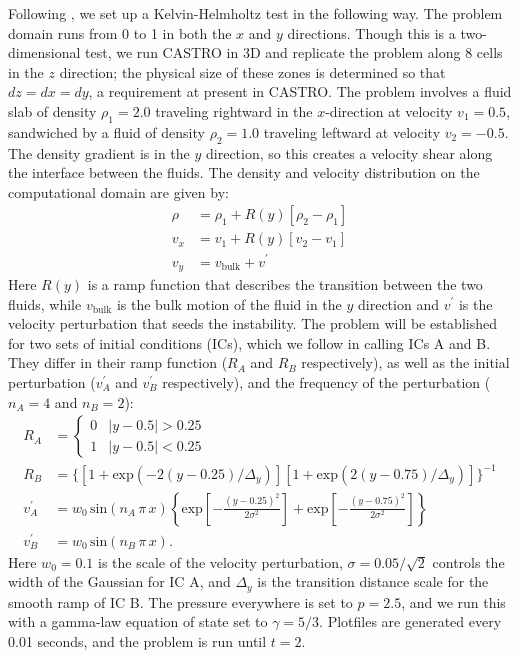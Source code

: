\documentclass[12pt,preprint]{aastex}
\begin{document}
Following \cite{robertson:2010}, we set up a Kelvin-Helmholtz test in the following way. The problem domain runs from 0 to 1 in both the $x$ and $y$ directions. Though this is a two-dimensional test, we run CASTRO in 3D and replicate the problem along 8 cells in the $z$ direction; the physical size of these zones is determined so that $dz = dx = dy$, a requirement at present in CASTRO. The problem involves a fluid slab of density $\rho_1 = 2.0$ traveling rightward in the $x$-direction at velocity $v_1 = 0.5$, sandwiched by a fluid of density $\rho_2 = 1.0$ traveling leftward at velocity $v_2 = -0.5$. The density gradient is in the $y$ direction, so this creates a velocity shear along the interface between the fluids. The density and velocity distribution on the computational domain are given by:
\begin{align}
  \rho &= \rho_1 + R(y)\left[\rho_2 - \rho_1\right] \\
  v_x  &= v_1 + R(y)\left[v_2 - v_1\right] \\
  v_y  &= v_{\text{bulk}} + v^\prime
\end{align}
Here $R(y)$ is a ramp function that describes the transition between the two fluids, while $v_{\text{bulk}}$ is the bulk motion of the fluid in the $y$ direction and $v^\prime$ is the velocity perturbation that seeds the instability. The problem will be established for two sets of initial conditions (ICs), which we follow \citeauthor{robertson:2010} in calling ICs A and B. They differ in their ramp function ($R_A$ and $R_B$ respectively), as well as the initial perturbation ($v^\prime_A$ and $v^\prime_B$ respectively), and the frequency of the perturbation ($n_A = 4$ and $n_B = 2$):
\begin{align}
  R_A &= \begin{cases} 0 & |y - 0.5| > 0.25 \\ 1 & |y - 0.5| < 0.25 \end{cases} \\
  R_B &= \Big\{\left[1 + \text{exp}(-2(y-0.25)/\Delta_y)\right]\left[1 + \text{exp}(2(y-0.75)/\Delta_y)\right]\Big\}^{-1} \\
  v^\prime_A &= w_0\, \text{sin}\left(n_A\, \pi\, x\right) \left\{\text{exp}\left[-\frac{(y-0.25)^2}{2\sigma^2}\right] + \text{exp}\left[-\frac{(y-0.75)^2}{2\sigma^2}\right]\right\} \\
  v^\prime_B &= w_0\, \text{sin}\left(n_B\, \pi\, x\right).
\end{align}
Here $w_0 = 0.1$ is the scale of the velocity perturbation, $\sigma = 0.05/\sqrt{2}$ controls the width of the Gaussian for IC A, and $\Delta_y$ is the transition distance scale for the smooth ramp of IC B. The pressure everywhere is set to $p = 2.5$, and we run this with a gamma-law equation of state set to $\gamma = 5/3$. Plotfiles are generated every 0.01 seconds, and the problem is run until $t = 2$.
\end{document}
